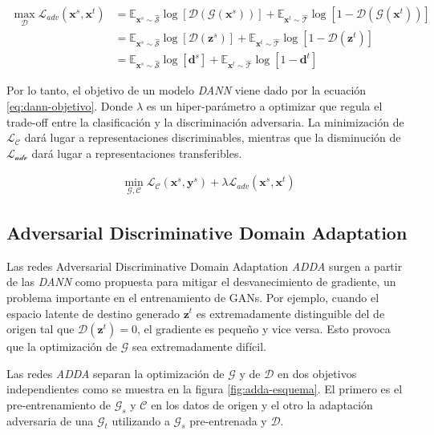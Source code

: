 \begin{align}
  \max_{\mathcal{D}} \mathcal{L}_{adv}(\mathbf{x}^s, \mathbf{x}^t) & = \mathbb{E}_{\mathbf{x}^s \sim \mathcal{\hat{S}}}\log[\mathcal{D}(\mathcal{G}(\mathbf{x}^s))] + \mathbb{E}_{\mathbf{x}^t \sim \mathcal{\hat{T}}}\log[1-\mathcal{D}(\mathcal{G}(\mathbf{x}^t))] \nonumber \\
                                                                   & = \mathbb{E}_{\mathbf{x}^s \sim \mathcal{\hat{S}}}\log[\mathcal{D}(\mathbf{z}^s)] + \mathbb{E}_{\mathbf{x}^t \sim \mathcal{\hat{T}}}\log[1-\mathcal{D}(\mathbf{z}^t)] \nonumber                           \\
                                                                   & = \mathbb{E}_{\mathbf{x}^s \sim \mathcal{\hat{S}}}\log[\mathbf{d}^s] + \mathbb{E}_{\mathbf{x}^t \sim \mathcal{\hat{T}}}\log[1-\mathbf{d}^t]
  \label{eq:dann-loss-discriminadora}
\end{align}

Por lo tanto, el objetivo de un modelo {\it DANN} viene dado por la ecuación \ref{eq:dann-objetivo}. Donde $\lambda$ es
un hiper-parámetro a optimizar que regula el trade-off entre la clasificación y la discriminación adversaria. La
minimización de $\mathcal{L}_\mathcal{C}$ dará lugar a representaciones discriminables, mientras que la disminución de
$\mathcal{L}_\mathcal{adv}$ dará lugar a representaciones transferibles.

\begin{align}
  \min_{\mathcal{G},\mathcal{C}} \mathcal{L}_\mathcal{C}(\mathbf{x}^s, \mathbf{y}^s) + \lambda \mathcal{L}_{adv}(\mathbf{x}^s, \mathbf{x}^t)
  \label{eq:dann-objetivo}
\end{align}

\subsection{Adversarial Discriminative Domain Adaptation}
Las redes Adversarial Discriminative Domain Adaptation {\it ADDA} \parencite{tzeng2017adversarial} surgen a partir de las {\it DANN} como propuesta para mitigar el desvanecimiento de
gradiente, un problema importante en el entrenamiento de GANs. Por ejemplo, cuando el espacio latente de destino
generado $\mathbf{z}^t$ es extremadamente distinguible del de origen tal que $\mathcal{D}(\mathbf{z}^t)=0$, el
gradiente es pequeño y vice versa. Esto provoca que la optimización de $\mathcal{G}$ sea extremadamente difícil.

Las redes {\it ADDA} separan la optimización de $\mathcal{G}$ y de $\mathcal{D}$ en dos objetivos independientes como
se muestra en la figura \ref{fig:adda-esquema}. El primero es el pre-entrenamiento de $\mathcal{G}_s$ y $\mathcal{C}$
en los datos de origen y el otro la adaptación adversaria de una $\mathcal{G}_t$ utilizando a $\mathcal{G}_s$
pre-entrenada y $\mathcal{D}$.


